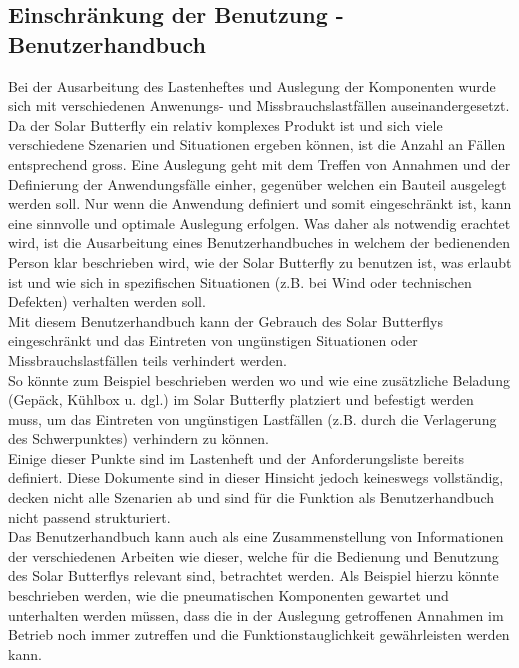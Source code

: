 
\subsection{Einschränkung der Benutzung - Benutzerhandbuch}
Bei der Ausarbeitung des Lastenheftes und Auslegung der Komponenten wurde sich mit verschiedenen Anwenungs- und Missbrauchslastfällen auseinandergesetzt. Da der Solar Butterfly ein relativ komplexes Produkt ist und sich viele verschiedene Szenarien und Situationen ergeben können, ist die Anzahl an Fällen entsprechend gross. Eine Auslegung geht mit dem Treffen von Annahmen und der Definierung der Anwendungsfälle einher, gegenüber welchen ein Bauteil ausgelegt werden soll. Nur wenn die Anwendung definiert und somit eingeschränkt ist, kann eine sinnvolle und optimale Auslegung erfolgen.
Was daher als notwendig erachtet wird, ist die Ausarbeitung eines \glqq Benutzerhandbuches\grqq{} in welchem der bedienenden Person klar beschrieben wird, wie der Solar Butterfly zu benutzen ist, was \glqq erlaubt\grqq{} ist und wie sich in spezifischen Situationen (z.B. bei Wind oder technischen Defekten) verhalten werden soll.\\
Mit diesem Benutzerhandbuch kann der Gebrauch des Solar Butterflys eingeschränkt und das Eintreten von ungünstigen Situationen oder Missbrauchslastfällen teils verhindert werden.\\
So könnte zum Beispiel beschrieben werden wo und wie eine zusätzliche Beladung (Gepäck, Kühlbox u. dgl.) im Solar Butterfly platziert und befestigt werden muss, um das Eintreten von ungünstigen Lastfällen (z.B. durch die Verlagerung des Schwerpunktes) verhindern zu können.\\
Einige dieser Punkte sind im Lastenheft und der Anforderungsliste bereits definiert. Diese Dokumente sind in dieser Hinsicht jedoch keineswegs vollständig, decken nicht alle Szenarien ab und sind für die Funktion als Benutzerhandbuch nicht passend strukturiert.\\
Das Benutzerhandbuch kann auch als eine Zusammenstellung von Informationen der verschiedenen Arbeiten wie dieser, welche für die Bedienung und Benutzung des Solar Butterflys relevant sind, betrachtet werden.
Als Beispiel hierzu könnte beschrieben werden, wie die pneumatischen Komponenten gewartet und unterhalten werden müssen, dass die in der Auslegung getroffenen Annahmen im Betrieb noch immer zutreffen und die Funktionstauglichkeit gewährleisten werden kann.

